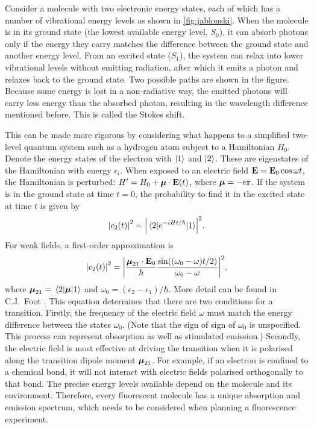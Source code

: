 Consider a molecule with two electronic energy states, each of which has a number of vibrational energy levels as shown in \autoref{fig:jablonski}. When the molecule is in its ground state (the lowest available energy level, $ S_0 $), it can absorb photons only if the energy they carry matches the difference between the ground state and another energy level. From an excited state ($ S_1 $), the system can relax into lower vibrational levels without emitting radiation, after which it emits a photon and relaxes back to the ground state. Two possible paths are shown in the figure. Because some energy is lost in a non-radiative way, the emitted photons will carry less energy than the absorbed photon, resulting in the wavelength difference mentioned before. This is called the Stokes shift. 

This can be made more rigorous by considering what happens to a simplified two-level quantum system such as a hydrogen atom subject to a Hamiltonian $ H_0 $. Denote the energy states of the electron with $ \ket{1} $ and $ \ket{2} $. These are eigenstates of the Hamiltonian with energy $ \epsilon_i$. When exposed to an electric field $ \vb{E} = \vb{E}_0 \cos\omega t$, the Hamiltonian is perturbed: $ H' = H_0 + \vb*{\mu} \cdot \vb{E}(t) $, where $ \vb*{\mu} = -e\vb{r}$. If the system is in the ground state at time $ t=0 $, the probability to find it in the excited state at time $ t $ is given by
\begin{equation}
	\abs{c_2(t)}^2 = \abs{\mel{2}{e^{-iHt/\hbar}}{1}}^2.
\end{equation}
For weak fields, a first-order approximation is
\begin{equation}
	\abs{c_2(t)}^2 = \abs{ \frac{\vb*{\mu}_{21}\cdot\vb{E}_0}{\hbar}  \frac{\sin((\omega_0-\omega)t/2)}{\omega_0-\omega}}^2,
	\label{eq:transition moment}
\end{equation}
where $ \vb*{\mu}_{21} = \mel{2}{\vb*{\mu}}{1} $ and $ \omega_0 = (\epsilon_2-\epsilon_1)/\hbar $. More detail can be found in C.J.~Foot \cite{Foot}. This equation determines that there are two conditions for a transition. Firstly, the frequency of the electric field $ \omega $ must match the energy difference between the states $ \omega_0 $. (Note that the sign of sign of $ \omega_0 $ is unspecified. This process can represent absorption as well as stimulated emission.) Secondly, the electric field is most effective at driving the transition when it is polarised along the transition dipole moment $ \vb*{\mu}_{21} $. For example, if an electron is confined to a chemical bond, it will not interact with electric fields polarised orthogonally to that bond. The precise energy levels available depend on the molecule and its environment. Therefore, every fluorescent molecule has a unique absorption and emission spectrum, which needs to be considered when planning a fluorescence experiment.

